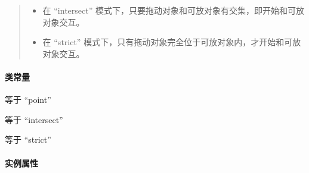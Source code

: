 \documentclass[letterpaper,10pt,english]{sphinxmanual}
\begin{document}
\begin{fulllineitems}
\begin{quote}
\begin{description}
\begin{fulllineitems}
\begin{itemize}
\item {}
在 ``intersect'' 模式下，只要拖动对象和可放对象有交集，即开始和可放对象交互。

\item {}
在 ``strict'' 模式下，只有拖动对象完全位于可放对象内，才开始和可放对象交互。

\end{itemize}

\end{fulllineitems}



\end{description}\end{quote}

\end{fulllineitems}



\paragraph{类常量}
\label{api/component/dd/draggable:id3}

\begin{fulllineitems}
\label{api/component/dd/draggable:DD.Draggable.POINT}
等于 ``point''

\end{fulllineitems}



\begin{fulllineitems}
\label{api/component/dd/draggable:DD.Draggable.INTERSECT}
等于 ``intersect''

\end{fulllineitems}



\begin{fulllineitems}
\label{api/component/dd/draggable:DD.Draggable.STRICT}
等于 ``strict''

\end{fulllineitems}



\paragraph{实例属性}
\label{api/component/dd/draggable:id4}
\end{document}
